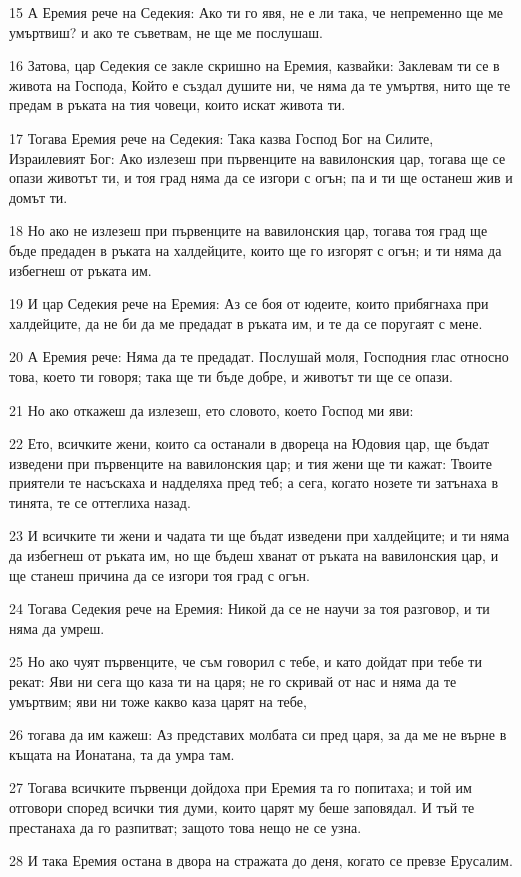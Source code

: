 \par 15 А Еремия рече на Седекия: Ако ти го явя, не е ли така, че непременно ще ме умъртвиш? и ако те съветвам, не ще ме послушаш.
\par 16 Затова, цар Седекия се закле скришно на Еремия, казвайки: Заклевам ти се в живота на Господа, Който е създал душите ни, че няма да те умъртвя, нито ще те предам в ръката на тия човеци, които искат живота ти.
\par 17 Тогава Еремия рече на Седекия: Така казва Господ Бог на Силите, Израилевият Бог: Ако излезеш при първенците на вавилонския цар, тогава ще се опази животът ти, и тоя град няма да се изгори с огън; па и ти ще останеш жив и домът ти.
\par 18 Но ако не излезеш при първенците на вавилонския цар, тогава тоя град ще бъде предаден в ръката на халдейците, които ще го изгорят с огън; и ти няма да избегнеш от ръката им.
\par 19 И цар Седекия рече на Еремия: Аз се боя от юдеите, които прибягнаха при халдейците, да не би да ме предадат в ръката им, и те да се поругаят с мене.
\par 20 А Еремия рече: Няма да те предадат. Послушай моля, Господния глас относно това, което ти говоря; така ще ти бъде добре, и животът ти ще се опази.
\par 21 Но ако откажеш да излезеш, ето словото, което Господ ми яви:
\par 22 Ето, всичките жени, които са останали в двореца на Юдовия цар, ще бъдат изведени при първенците на вавилонския цар; и тия жени ще ти кажат: Твоите приятели те насъскаха и надделяха пред теб; а сега, когато нозете ти затънаха в тинята, те се оттеглиха назад.
\par 23 И всичките ти жени и чадата ти ще бъдат изведени при халдейците; и ти няма да избегнеш от ръката им, но ще бъдеш хванат от ръката на вавилонския цар, и ще станеш причина да се изгори тоя град с огън.
\par 24 Тогава Седекия рече на Еремия: Никой да се не научи за тоя разговор, и ти няма да умреш.
\par 25 Но ако чуят първенците, че съм говорил с тебе, и като дойдат при тебе ти рекат: Яви ни сега що каза ти на царя; не го скривай от нас и няма да те умъртвим; яви ни тоже какво каза царят на тебе,
\par 26 тогава да им кажеш: Аз представих молбата си пред царя, за да ме не върне в къщата на Ионатана, та да умра там.
\par 27 Тогава всичките първенци дойдоха при Еремия та го попитаха; и той им отговори според всички тия думи, които царят му беше заповядал. И тъй те престанаха да го разпитват; защото това нещо не се узна.
\par 28 И така Еремия остана в двора на стражата до деня, когато се превзе Ерусалим.

